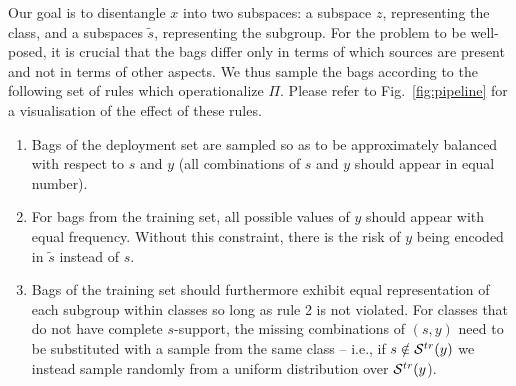 Our goal is to disentangle $x$ into two subspaces: a subspace $z$, representing the class, and a
subspaces $\tilde{s}$,
representing the subgroup.
For the problem to be well-posed, it is crucial that the bags differ only
in terms of which sources are present and not in terms of other aspects.
We thus sample the bags according to the following set of rules which operationalize $\Pi$. Please
refer to Fig.~\ref{fig:pipeline} for a visualisation of the effect of these rules. 
%
\begin{enumerate}\label{ls:rules}
  \item Bags of the deployment set are sampled so as to be approximately balanced with
    respect to $s$ and $y$ (all combinations of $s$ and $y$ should appear in equal number). 
  \item For bags from the training set, all possible values of $y$ should appear with equal
    frequency. Without this constraint, there is the risk of $y$ being encoded in $\tilde{s}$
    instead of $s$. 
  \item Bags of the training set should furthermore exhibit equal representation of each subgroup
    within classes so long as rule 2 is not violated.
    For classes that do not have complete $s$-support, the missing combinations of $(s, y)$ need to
    be substituted with a sample from the same class -- i.e., if $s \notin {\mathcal{S}}^{tr}(y)$ we instead
    sample randomly from a uniform distribution over ${\mathcal{S}}^{tr}(y$). 
\end{enumerate}






